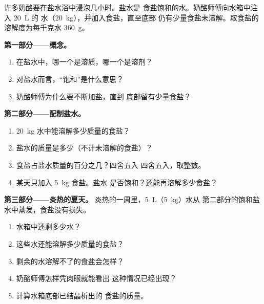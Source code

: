 \begin{problem}
\label{pb:g6:solutions-and-solubility:1}
许多奶酪要在盐水浴中浸泡几小时。盐水是
食盐饱和的水。奶酪师傅向水箱中注入 \qty{20}{L} 的
水（\qty{20}{kg}），并加入食盐，直至底部
仍有少量食盐未溶解。取食盐的溶解度为每千克水
\qty{360}{g}。

\medskip
\noindent\textbf{第一部分——概念。}
\begin{enumerate}
  \item 在盐水中，哪一个是溶质，哪一个是溶剂？
  \item 对盐水而言，“饱和”是什么意思？
  \item 奶酪师傅为什么要不断加盐，直到
        底部留有少量食盐？
\end{enumerate}

\medskip
\noindent\textbf{第二部分——配制盐水。}
\begin{enumerate}[resume]
  \item \qty{20}{kg} 水中能溶解多少质量的食盐？
  \item 盐水的质量是多少（不计未溶解的食盐）？
  \item 食盐占盐水质量的百分之几？四舍五入
        四舍五入，取整数。
  \item 某天只加入 \qty{5}{kg} 食盐。盐水
        是否饱和？还能再溶解多少食盐？
\end{enumerate}

\medskip
\noindent\textbf{第三部分——炎热的夏天。}
炎热的一周里，\qty{5}{L}（\qty{5}{kg}）水从
第二部分的饱和盐水中蒸发，食盐没有损失。
\begin{enumerate}[resume]
  \item 水箱中还剩多少水？
  \item 这些水还能溶解多少质量的食盐？
  \item 剩余的水溶解不了的食盐会怎样？
  \item 奶酪师傅怎样凭肉眼就能看出
        这种情况已经出现？
  \item 计算水箱底部已结晶析出的
        食盐的质量。
\end{enumerate}
\end{problem}
